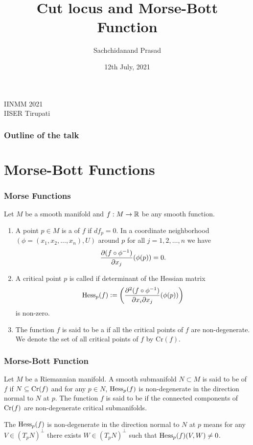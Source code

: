 \documentclass{beamer}
\title{Cut locus and Morse-Bott Function}
\author{Sachchidanand Prasad}
\institute{\small Indian Institute of Science Education and Research, Kolkata, India}
\date{12th July, 2021}
\begin{document}
	\titlepage
	\vspace{0.1cm}
	\begin{center}
		\Large \textcolor[rgb]{0.4,0,0.5}{IINMM 2021 \\
		\noindent IISER Tirupati}
	\end{center}

	\begin{frame}
		\frametitle<presentation>{Outline of the talk}
		\tableofcontents
	\end{frame}	

	\section{Morse-Bott Functions}
	\begin{frame}
		\frametitle<presentation>{Morse Functions}
		\p Let $M$ be a smooth manifold and $f:M\to \mathbb{R}$  be any smooth function.
		\begin{enumerate}
			\p \item A point $p\in M$ is a \emph{} of $f$ if $df_p = 0$. \p In a coordinate neighborhood $(\phi=(x_1,x_2,\ldots,x_n),U)$ around $p$ for all $j=1,2,\ldots,n$ we have 
			\begin{displaymath}
			\dfrac{\partial(f\circ \phi^{-1})}{\partial x_j}(\phi(p))=0. 
			\end{displaymath}
			\p \item A critical point $p$ is called {\emph{}} \p if determinant of the Hessian matrix
			\begin{displaymath}
			\mathrm{Hess}_p(f) \vcentcolon= \left(\dfrac{\partial^2(f\circ \phi^{-1})}{\partial x_i\partial x_j}(\phi(p))\right)
			\end{displaymath}
			is non-zero. 
			\p \item The function $f$ is said to be a \emph{} if all the critical points of $f$ are non-degenerate. \p We denote the set of all critical points of $f$ by $\mathrm{Cr}(f)$.
		\end{enumerate}
	\end{frame}	

	\begin{frame}
		\frametitle<presentation>{Morse-Bott Function}
		
		\p\begin{definition}
			\p Let $M$ be a Riemannian manifold. A smooth submanifold $ N\subset M $ is said to be {\emph{}} of $f$ if $N\subseteq \mathrm{Cr}(f)$ \p and for any $p\in N$, $\mathrm{Hess}_{p}(f)$ is \alert<5>{non-degenerate in the direction normal to $N$ at $p$}. \p[6] The function $f$ is said to be {\emph{}} if the connected components of $ \mathrm{Cr}(f) $ are non-degenerate critical submanifolds.
		\end{definition}
		\p[5] The $\mathrm{Hess}_p(f)$ is \alert<5>{non-degenerate in the direction normal to $N$ at $p$} means for any $V\in (T_pN)^\perp$ there exists $W\in  (T_pN)^\perp$ such that $\mathrm{Hess}_p(f)(V,W)\neq 0$.
	\end{frame}	
\end{document}
